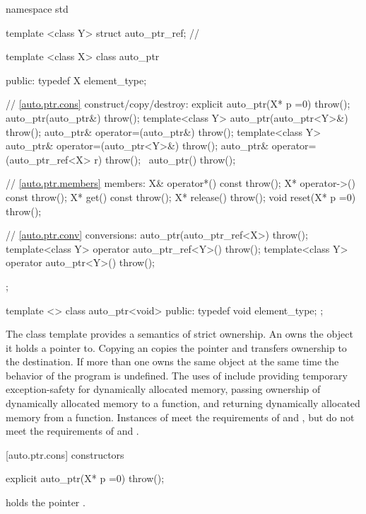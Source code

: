 \begin{codeblock}
namespace std {
  template <class Y> struct auto_ptr_ref;   // \expos

  template <class X> class auto_ptr {
  public:
    typedef X element_type;

    // \ref{auto.ptr.cons} construct/copy/destroy:
    explicit auto_ptr(X* p =0) throw();
    auto_ptr(auto_ptr&) throw();
    template<class Y> auto_ptr(auto_ptr<Y>&) throw();
    auto_ptr& operator=(auto_ptr&) throw();
    template<class Y> auto_ptr& operator=(auto_ptr<Y>&) throw();
    auto_ptr& operator=(auto_ptr_ref<X> r) throw();
   ~auto_ptr() throw();

    // \ref{auto.ptr.members} members:
    X& operator*() const throw();
    X* operator->() const throw();
    X* get() const throw();
    X* release() throw();
    void reset(X* p =0) throw();

    // \ref{auto.ptr.conv} conversions:
    auto_ptr(auto_ptr_ref<X>) throw();
    template<class Y> operator auto_ptr_ref<Y>() throw();
    template<class Y> operator auto_ptr<Y>() throw();
  };

  template <> class auto_ptr<void>
  {
  public:
    typedef void element_type;
  };
}
\end{codeblock}

\pnum
The class template  provides a semantics of strict ownership. An 
owns the object it holds a pointer to. Copying an  copies the
pointer and transfers ownership to the destination. If more than one
 owns the same object at the same time the behavior of the
program is undefined.
\enternote 
The uses of  include providing temporary exception-safety
for dynamically allocated memory, passing ownership of dynamically allocated
memory to a function, and returning dynamically allocated memory from a function.
Instances of  meet the requirements of  and , but do not meet the requirements of  and .
\exitnote

[auto.ptr.cons]{ constructors}

%
\begin{itemdecl}
explicit auto_ptr(X* p =0) throw();
\end{itemdecl}

\begin{itemdescr}
\pnum
\postconditions
{} holds the pointer .
\end{itemdescr}

